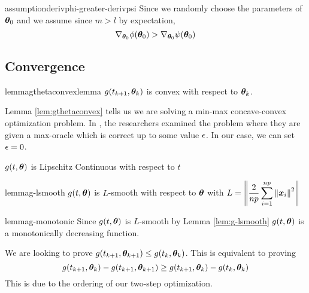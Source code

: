 \documentclass{article} %
\newenvironment{proofsketch}{%
	\renewcommand{\proofname}{Proof Sketch}\proof}{\endproof}
\newcommand{\norm}[1]{\left\lVert#1\right\rVert}
\begin{document}
	\begin{restatable}{assumption}{derivphi-greater-derivpsi}
		\label{asm:derivphi-greater-derivpsi}
		Since we randomly choose the parameters of ${\bm{\theta}}_0$ and we assume since $m > l$ by expectation,
		\begin{equation}
			\nabla_{{\bm{\theta}}_0}\phi({\bm{\theta}}_0) > \nabla_{{\bm{\theta}}_0}\psi({\bm{\theta}}_0)
		\end{equation}
	\end{restatable}
	
	

	\subsection{Convergence}	
	\begin{restatable}{lemma}{gthetaconvexlemma}
		\label{lem:gthetaconvex}
		$g(t_{k+1},{\bm{\theta}}_k)$ is convex with respect to ${\bm{\theta}}_k$.
	\end{restatable}
	
	Lemma \ref{lem:gthetaconvex} tells us we are solving a min-max concave-convex optimization problem. In \cite{Jin_2019}, the researchers examined the problem where they are given a max-oracle which is correct up to some value ${\epsilon}$. In our case, we can set ${\epsilon} = 0$.
	
	
	\begin{lemma} $g(t,{\bm{\theta}})$ is Lipschitz Continuous with respect to $t$
		
	\end{lemma}
	
	\begin{restatable}{lemma}{g-lsmooth}
		\label{lem:g-lsmooth}
		$g(t,{\bm{\theta}})$ is $L$-smooth with respect to ${\bm{\theta}}$ with $\displaystyle L = \norm{\frac{2}{np}\sum_{i=1}^{np}\norm{\vx_i}^2}$ 
	\end{restatable}

	\begin{restatable}{lemma}{g-monotonic}
		\label{lem:g-monotonic}
		Since $g(t,{\bm{\theta}})$ is $L$-smooth by Lemma \ref{lem:g-lsmooth} $g(t,{\bm{\theta}})$ is a monotonically decreasing function. 
	\end{restatable}
	\begin{proofsketch}
		We are looking to prove $g(t_{k+1},{\bm{\theta}}_{k+1}) \leq g(t_k,{\bm{\theta}}_k)$. This is equivalent to proving 
		\begin{equation}
			g(t_{k+1},{\bm{\theta}}_k) - g(t_{k+1},{\bm{\theta}}_{k+1}) \geq g(t_{k+1},{\bm{\theta}}_k) - g(t_k,{\bm{\theta}}_k)
		\end{equation}
		This is due to the ordering of our two-step optimization.
	\end{proofsketch}
\end{document}

